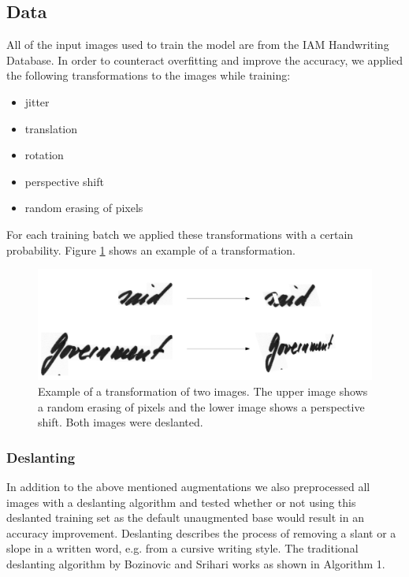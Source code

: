 \documentclass{article}
\begin{document}
\subsection{Data}
All of the input images used to train the model are from the IAM Handwriting Database\cite{IAM}.
In order to counteract overfitting and improve the accuracy, we applied the following transformations to the images while training: 
\begin{itemize}
\item jitter
\item translation
\item rotation
\item perspective shift
\item random erasing of pixels
\end{itemize}
For each training batch we applied these transformations with a certain probability. Figure \ref{fig:augmentations} shows an example of a transformation.
\begin{figure}[H]
\begin{center}
\includegraphics[scale=0.3]{rsz_transform}
\end{center}
\caption{Example of a transformation of two images. The upper image shows a random erasing of pixels and the lower image shows a perspective shift. Both images were deslanted.}
\label{fig:augmentations}
\end{figure}

\subsubsection{Deslanting}
In addition to the above mentioned augmentations we also preprocessed all images with a deslanting algorithm and tested whether or not using this deslanted training set as the default unaugmented base would result in an accuracy improvement. Deslanting describes the process of removing a slant or a slope in a written word, e.g. from a cursive writing style. The traditional deslanting algorithm by Bozinovic and Srihari \cite{Bozinovic} works as shown in Algorithm 1.
\end{document}
